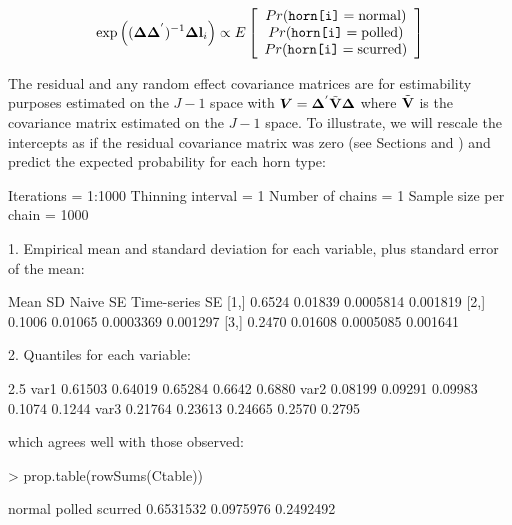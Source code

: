 \documentclass{article}
\begin{document}
\begin{equation}
\textrm{exp}\left(({\bm \Delta}{\bm \Delta}^{'})^{-1}{\bm \Delta}{\bf l}_{i}\right) \propto E\left[\begin{array}{c} Pr(\texttt{horn[i]}=\textrm{normal})\\ Pr(\texttt{horn[i]}=\textrm{polled})\\ Pr(\texttt{horn[i]}=\textrm{scurred}) \end{array} \right]
\end{equation}

The residual and any random effect covariance matrices are for estimability purposes estimated on the $J-1$ space with  ${\bm V}={\bm \Delta}^{'}\tilde{\bf V}{\bm \Delta}$ where $\tilde{\bf V}$ is the covariance matrix estimated on the $J-1$ space. To illustrate, we will rescale the intercepts as if the residual covariance matrix was zero (see Sections and \label{pred-sec} \label{cat-sec}) and predict the expected probability for each horn type:

\begin{Schunk}
\begin{Soutput}
Iterations = 1:1000
Thinning interval = 1 
Number of chains = 1 
Sample size per chain = 1000 

1. Empirical mean and standard deviation for each variable,
   plus standard error of the mean:

       Mean      SD  Naive SE Time-series SE
[1,] 0.6524 0.01839 0.0005814       0.001819
[2,] 0.1006 0.01065 0.0003369       0.001297
[3,] 0.2470 0.01608 0.0005085       0.001641

2. Quantiles for each variable:

        2.5%
var1 0.61503 0.64019 0.65284 0.6642 0.6880
var2 0.08199 0.09291 0.09983 0.1074 0.1244
var3 0.21764 0.23613 0.24665 0.2570 0.2795
\end{Soutput}
\end{Schunk}

which agrees well with those observed:

\begin{Schunk}
\begin{Sinput}
> prop.table(rowSums(Ctable))
\end{Sinput}
\begin{Soutput}
   normal    polled   scurred 
0.6531532 0.0975976 0.2492492 
\end{Soutput}
\end{Schunk}
\end{document}
